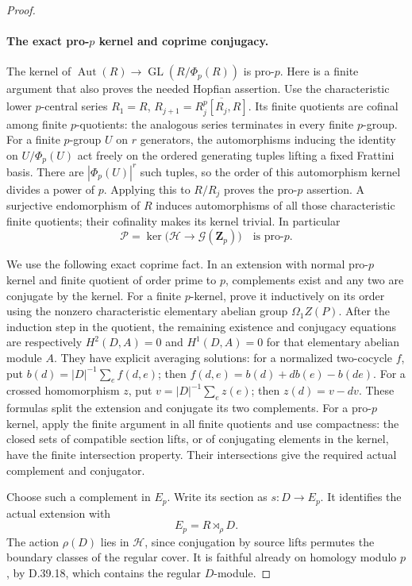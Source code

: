 \begin{proof}
\paragraph{The exact pro-\(p\) kernel and coprime conjugacy.}
The kernel of
\(\operatorname{Aut}(R)\to
\operatorname{GL}(R/\Phi_p(R))\)
is pro-\(p\).
Here is a finite argument that also proves
the needed Hopfian assertion.
Use the characteristic lower \(p\)-central
series \(R_1=R\),
\(R_{j+1}=\overline{R_j^p[R_j,R]}\).
Its finite quotients are cofinal among
finite \(p\)-quotients: the analogous series
terminates in every finite \(p\)-group.
For a finite \(p\)-group \(U\) on \(r\)
generators, the automorphisms inducing the
identity on \(U/\Phi_p(U)\) act freely on
the ordered generating tuples lifting a
fixed Frattini basis.
There are \(|\Phi_p(U)|^r\) such tuples,
so the order of this automorphism kernel
divides a power of \(p\).
Applying this to \(R/R_j\) proves the
pro-\(p\) assertion.
A surjective endomorphism of \(R\) induces
automorphisms of all those characteristic
finite quotients; their cofinality makes
its kernel trivial.
In particular
\[
 \mathcal P=
 \ker\bigl(\mathcal H\to
              \mathcal G(\mathbf Z_p)\bigr)
                 \quad\text{is pro-}p.
 \tag{D.41.11}
\]

We use the following exact coprime fact.
In an extension with normal pro-\(p\)
kernel and finite quotient of order prime
to \(p\), complements exist and any two
are conjugate by the kernel.
For a finite \(p\)-kernel, prove it
inductively on its order using the nonzero
characteristic elementary abelian group
\(\Omega_1 Z(P)\).
After the induction step in the quotient,
the remaining existence and conjugacy
equations are respectively \(H^2(D,A)=0\)
and \(H^1(D,A)=0\) for that elementary
abelian module \(A\).
They have explicit averaging solutions:
for a normalized two-cocycle \(f\), put
\(b(d)=|D|^{-1}\sum_e f(d,e)\);
then \(f(d,e)=b(d)+d b(e)-b(de)\).
For a crossed homomorphism \(z\), put
\(v=|D|^{-1}\sum_e z(e)\);
then \(z(d)=v-dv\).
These formulas split the extension and
conjugate its two complements.
For a pro-\(p\) kernel, apply the finite
argument in all finite quotients and use
compactness: the closed sets of compatible
section lifts, or of conjugating elements
in the kernel, have the finite intersection
property.  Their intersections give the
required actual complement and conjugator.

Choose such a complement in \(E_p\).
Write its section as \(s:D\to E_p\).
It identifies the actual extension with
\[
                    E_p=R\rtimes_\rho D.
 \tag{D.41.12}
\]
The action \(\rho(D)\) lies in
\(\mathcal H\), since conjugation by
source lifts permutes the boundary
classes of the regular cover.
It is faithful already on homology
modulo \(p\), by D.39.18, which contains
the regular \(D\)-module.


\end{proof}

